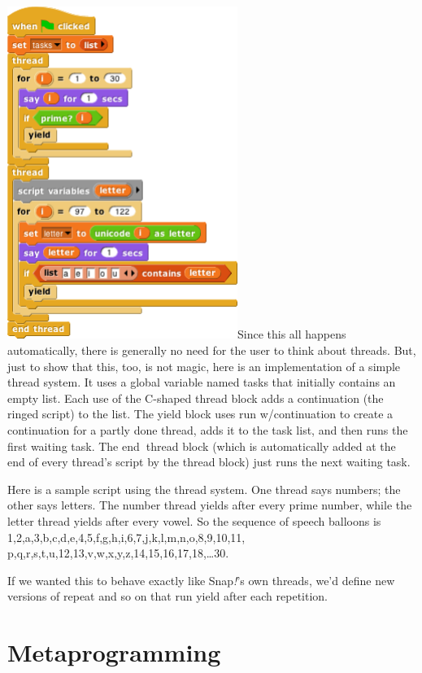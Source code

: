 \includegraphics[width=2.94792in,height=4.25417in]{media/image928.png}Since
this all happens automatically, there is generally no need for the user
to think about threads. But, just to show that this, too, is not magic,
here is an implementation of a simple thread system. It uses a global
variable named tasks that initially contains an empty list. Each use of
the C-shaped thread block adds a continuation (the ringed script) to the
list. The yield block uses run w/continuation to create a continuation
for a partly done thread, adds it to the task list, and then runs the
first waiting task. The end\textbf{~}thread block (which is
automatically added at the end of every thread's script by the thread
block) just runs the next waiting task.

Here is a sample script using the thread system. One thread says
numbers; the other says letters. The number thread yields after every
prime number, while the letter thread yields after every vowel. So the
sequence of speech balloons is
1,2,a,3,b,c,d,e,4,5,f,g,h,i,6,7,j,k,l,m,n,o,8,9,10,11,
p,q,r,s,t,u,12,13,v,w,x,y,z,14,15,16,17,18,\ldots30.

If we wanted this to behave exactly like Snap\emph{!}'s own threads,
we'd define new versions of repeat and so on that run yield after each
repetition.

\section{\texorpdfstring{\hfill\break
Metaprogramming}{ Metaprogramming}}\label{metaprogramming}

